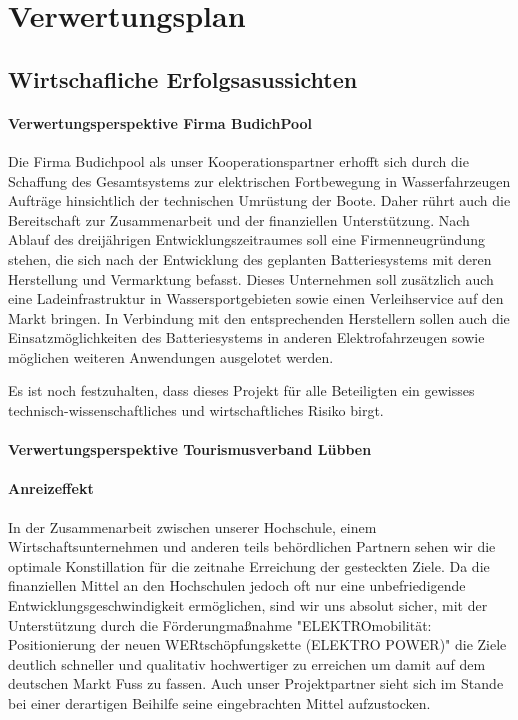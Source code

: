 
\chapter{Verwertungsplan}
\label{sec:Verwertungsplan}


\section{Wirtschafliche Erfolgsasussichten}
\label{sec:WirtschaflicheErfolgsasussichten}

\subsubsection{Verwertungsperspektive Firma BudichPool }
Die Firma Budichpool als unser Kooperationspartner erhofft sich durch die Schaffung des Gesamtsystems zur elektrischen Fortbewegung in Wasserfahrzeugen Aufträge hinsichtlich der technischen Umrüstung der Boote. Daher rührt auch die Bereitschaft zur Zusammenarbeit und der finanziellen Unterstützung. Nach Ablauf des dreijährigen Entwicklungszeitraumes  soll eine Firmenneugründung stehen, die sich nach der Entwicklung des geplanten Batteriesystems mit deren Herstellung und Vermarktung befasst. Dieses Unternehmen soll zusätzlich auch eine Ladeinfrastruktur in Wassersportgebieten sowie einen Verleihservice auf den Markt bringen. 
In Verbindung mit den entsprechenden Herstellern sollen auch die Einsatzmöglichkeiten des Batteriesystems in anderen Elektrofahrzeugen sowie möglichen weiteren Anwendungen ausgelotet werden.  

Es ist noch festzuhalten, dass dieses Projekt für alle Beteiligten ein gewisses technisch-wissenschaftliches und wirtschaftliches Risiko birgt. 

\subsubsection{Verwertungsperspektive Tourismusverband Lübben }
\subsubsection{Anreizeffekt}

In der Zusammenarbeit zwischen unserer Hochschule, einem Wirtschaftsunternehmen und anderen teils behördlichen Partnern  sehen wir die optimale Konstillation für die zeitnahe Erreichung der gesteckten Ziele. Da die finanziellen Mittel an den Hochschulen jedoch oft nur eine unbefriedigende Entwicklungsgeschwindigkeit ermöglichen, sind wir uns absolut sicher, mit der Unterstützung durch die Förderungmaßnahme "ELEKTROmobilität: Positionierung der neuen WERtschöpfungskette (ELEKTRO POWER)" die Ziele deutlich schneller und qualitativ hochwertiger zu erreichen um damit auf dem deutschen Markt Fuss zu fassen. Auch unser Projektpartner sieht sich im Stande bei einer derartigen Beihilfe seine eingebrachten Mittel aufzustocken. 
